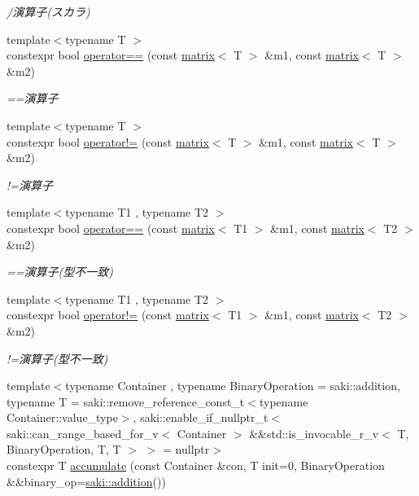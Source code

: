 \begin{DoxyCompactItemize}
\begin{DoxyCompactList}\small\item\em /演算子(スカラ) \end{DoxyCompactList}\item 
{\footnotesize template$<$typename T $>$ }\\constexpr bool \mbox{\hyperlink{namespacesaki_a67e5e15cae6e9152e0bd5ac2e1705da4}{operator==}} (const \mbox{\hyperlink{classsaki_1_1matrix}{matrix}}$<$ T $>$ \&m1, const \mbox{\hyperlink{classsaki_1_1matrix}{matrix}}$<$ T $>$ \&m2)
\begin{DoxyCompactList}\small\item\em ==演算子 \end{DoxyCompactList}\item 
{\footnotesize template$<$typename T $>$ }\\constexpr bool \mbox{\hyperlink{namespacesaki_a76722addb100e11d9eb9370ced3b027c}{operator!=}} (const \mbox{\hyperlink{classsaki_1_1matrix}{matrix}}$<$ T $>$ \&m1, const \mbox{\hyperlink{classsaki_1_1matrix}{matrix}}$<$ T $>$ \&m2)
\begin{DoxyCompactList}\small\item\em !=演算子 \end{DoxyCompactList}\item 
{\footnotesize template$<$typename T1 , typename T2 $>$ }\\constexpr bool \mbox{\hyperlink{namespacesaki_a1ffbf8122dda5209dc384e64747bec32}{operator==}} (const \mbox{\hyperlink{classsaki_1_1matrix}{matrix}}$<$ T1 $>$ \&m1, const \mbox{\hyperlink{classsaki_1_1matrix}{matrix}}$<$ T2 $>$ \&m2)
\begin{DoxyCompactList}\small\item\em ==演算子(型不一致) \end{DoxyCompactList}\item 
{\footnotesize template$<$typename T1 , typename T2 $>$ }\\constexpr bool \mbox{\hyperlink{namespacesaki_a4bef07cf55a40a115c89e6e20406b124}{operator!=}} (const \mbox{\hyperlink{classsaki_1_1matrix}{matrix}}$<$ T1 $>$ \&m1, const \mbox{\hyperlink{classsaki_1_1matrix}{matrix}}$<$ T2 $>$ \&m2)
\begin{DoxyCompactList}\small\item\em !=演算子(型不一致) \end{DoxyCompactList}\item 
{\footnotesize template$<$typename Container , typename Binary\+Operation  = saki\+::addition, typename T  = saki\+::remove\+\_\+reference\+\_\+const\+\_\+t$<$typename Container\+::value\+\_\+type$>$, saki\+::enable\+\_\+if\+\_\+nullptr\+\_\+t$<$ saki\+::can\+\_\+range\+\_\+based\+\_\+for\+\_\+v$<$ Container $>$ \&\&std\+::is\+\_\+invocable\+\_\+r\+\_\+v$<$ T, Binary\+Operation, T, T $>$ $>$  = nullptr$>$ }\\constexpr T \mbox{\hyperlink{namespacesaki_a6f2ea69ef5e31c8004ba36bb10384333}{accumulate}} (const Container \&con, T init=0, Binary\+Operation \&\&binary\+\_\+op=\mbox{\hyperlink{structsaki_1_1addition}{saki\+::addition}}())

\end{DoxyCompactItemize}

